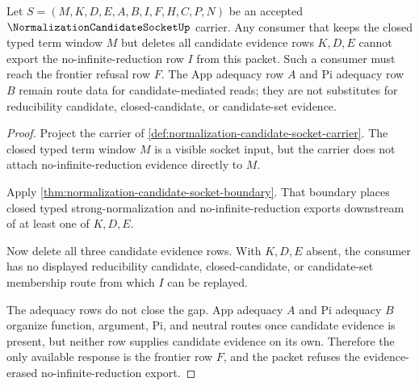 \begin{theorem}
\label{thm:normalization-candidate-socket-candidate-erasure-refusal}
Let $S=(M,K,D,E,A,B,I,F,H,C,P,N)$ be an accepted $\NormalizationCandidateSocketUp$ carrier. Any consumer that keeps the closed typed term window $M$ but deletes all candidate evidence rows $K,D,E$ cannot export the no-infinite-reduction row $I$ from this packet. Such a consumer must reach the frontier refusal row $F$. The App adequacy row $A$ and Pi adequacy row $B$ remain route data for candidate-mediated reads; they are not substitutes for reducibility candidate, closed-candidate, or candidate-set evidence.
\end{theorem}
\begin{proof}
Project the carrier of \autoref{def:normalization-candidate-socket-carrier}. The closed typed term window $M$ is a visible socket input, but the carrier does not attach no-infinite-reduction evidence directly to $M$.

Apply \autoref{thm:normalization-candidate-socket-boundary}. That boundary places closed typed strong-normalization and no-infinite-reduction exports downstream of at least one of $K,D,E$.

Now delete all three candidate evidence rows. With $K,D,E$ absent, the consumer has no displayed reducibility candidate, closed-candidate, or candidate-set membership route from which $I$ can be replayed.

The adequacy rows do not close the gap. App adequacy $A$ and Pi adequacy $B$ organize function, argument, Pi, and neutral routes once candidate evidence is present, but neither row supplies candidate evidence on its own. Therefore the only available response is the frontier row $F$, and the packet refuses the evidence-erased no-infinite-reduction export.
\end{proof}

